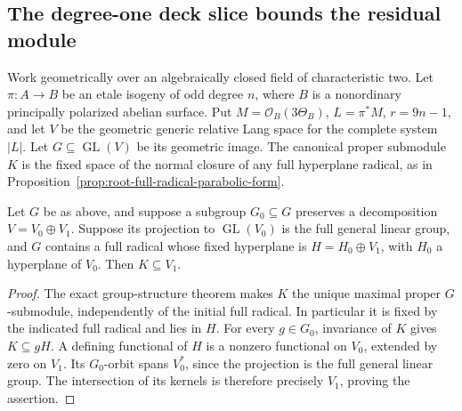 \subsection{The degree-one deck slice bounds the residual module}

Work geometrically over an algebraically closed field of characteristic
two. Let \(\pi:A\to B\) be an etale isogeny of odd degree \(n\),
where \(B\) is a nonordinary principally polarized abelian surface.
Put \(M=\mathcal O_B(3\Theta_B)\), \(L=\pi^*M\),
\(r=9n-1\), and let \(V\) be the geometric generic relative
Lang space for the complete system \(|L|\).
Let \(G\subseteq\operatorname{GL}(V)\) be its geometric image.
The canonical proper submodule \(K\) is the fixed space of the
normal closure of any full hyperplane radical, as in
Proposition~\ref{prop:root-full-radical-parabolic-form}.

\begin{lemma}
\label{lem:DE-Lang-block-slice-bound}
Let \(G\) be as above, and suppose a subgroup \(G_0\subseteq G\)
preserves a decomposition \(V=V_0\oplus V_1\). Suppose its
projection to \(\operatorname{GL}(V_0)\) is the full general
linear group, and \(G\) contains a full radical whose fixed
hyperplane is \(H=H_0\oplus V_1\), with \(H_0\) a hyperplane
of \(V_0\). Then \(K\subseteq V_1\).
\end{lemma}
\begin{proof}
The exact group-structure theorem makes \(K\) the unique maximal
proper \(G\)-submodule, independently of the initial full radical.
In particular it is fixed by the indicated full radical and lies
in \(H\). For every \(g\in G_0\), invariance of \(K\) gives
\(K\subseteq gH\). A defining functional of \(H\) is a nonzero
functional on \(V_0\), extended by zero on \(V_1\).
Its \(G_0\)-orbit spans \(V_0^*\), since the projection is the
full general linear group. The intersection of its kernels is
therefore precisely \(V_1\), proving the assertion.
\end{proof}


